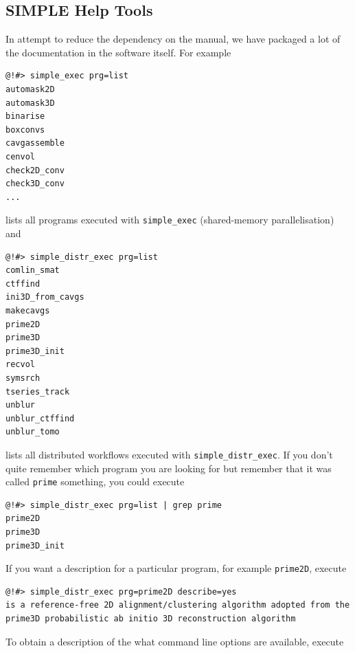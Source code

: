 \documentclass[a4paper,11pt]{article}
\newcommand{\prgname}[1]{\textcolor{NavyBlue}{\texttt{#1}}}
\begin{document}
\subsection{SIMPLE Help Tools}
In attempt to reduce the dependency on the manual, we have packaged a lot of the documentation in the software itself. For example
\begin{verbatim}
@!#> simple_exec prg=list
automask2D
automask3D
binarise
boxconvs
cavgassemble
cenvol
check2D_conv
check3D_conv
...
\end{verbatim}
lists all programs executed with \texttt{simple\_exec} (shared-memory parallelisation) and
\begin{verbatim}
@!#> simple_distr_exec prg=list
comlin_smat
ctffind
ini3D_from_cavgs
makecavgs
prime2D
prime3D
prime3D_init
recvol
symsrch
tseries_track
unblur
unblur_ctffind
unblur_tomo
\end{verbatim}
lists all distributed workflows executed with \texttt{simple\_distr\_exec}. If you don't quite remember which program you are looking for but remember that it was called \texttt{prime} something, you could execute
\begin{verbatim}
@!#> simple_distr_exec prg=list | grep prime
prime2D
prime3D
prime3D_init
\end{verbatim}
If you want a description for a particular program, for example \prgname{prime2D}, execute
\begin{verbatim}
@!#> simple_distr_exec prg=prime2D describe=yes
is a reference-free 2D alignment/clustering algorithm adopted from the 
prime3D probabilistic ab initio 3D reconstruction algorithm
\end{verbatim}
To obtain a description of the what command line options are available, execute
\end{document}
